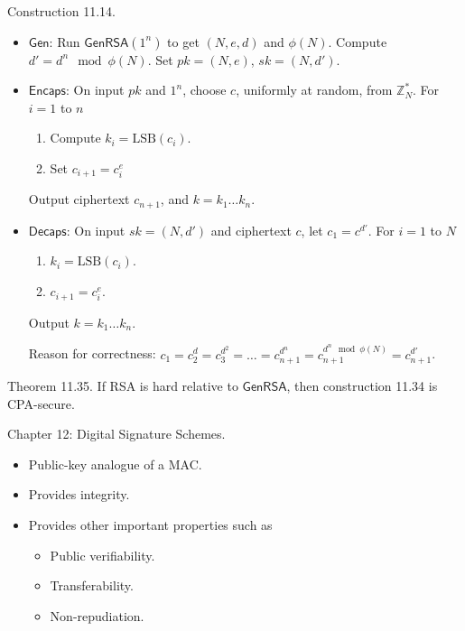 \documentclass[12pt]{article}
\newcommand{\Z}{\mathbb{Z}}
\newcommand{\Encaps}{\mathsf{Encaps}}
\newcommand{\Decaps}{\mathsf{Decaps}}
\newcommand{\Gen}{\mathsf{Gen}}
\newcommand{\GenRSA}{\mathsf{GenRSA}}
\begin{document}
Construction 11.14.\begin{itemize}

\item $\Gen$: Run $\GenRSA(1^n)$ to get $(N,e,d)$ and $\phi(N)$. Compute $d'=d^n\mod{\phi(N)}$. Set $pk=(N,e)$, $sk=(N,d')$.

\item $\Encaps$: On input $pk$ and $1^n$, choose $c$, uniformly at random, from $\Z_N^*$. For $i=1$ to $n$\begin{enumerate}

\item Compute $k_i=\text{LSB}(c_i)$.

\item Set $c_{i+1}=c_i^e$

\end{enumerate}

Output ciphertext $c_{n+1}$, and $k=k_1\dots k_n$.

\item $\Decaps$: On input $sk=(N,d')$ and ciphertext $c$, let $c_1=c^{d'}$. For $i=1$ to $N$\begin{enumerate}

\item $k_i=\text{LSB}(c_i)$.

\item $c_{i+1}=c_i^e$.

\end{enumerate}

Output $k=k_1\dots k_n$.

Reason for correctness: $c_1=c_2^d=c_3^{d^2}=\dots=c_{n+1}^{d^n}=c_{n+1}^{d^n\mod{\phi(N)}}=c_{n+1}^{d'}$.

\end{itemize}

Theorem 11.35. If RSA is hard relative to $\GenRSA$, then construction 11.34 is CPA-secure.

Chapter 12: Digital Signature Schemes.\begin{itemize}

\item Public-key analogue of a MAC.

\item Provides integrity.

\item Provides other important properties such as\begin{itemize}

\item Public verifiability.

\item Transferability.

\item Non-repudiation.

\end{itemize}

\end{itemize}
\end{document}
